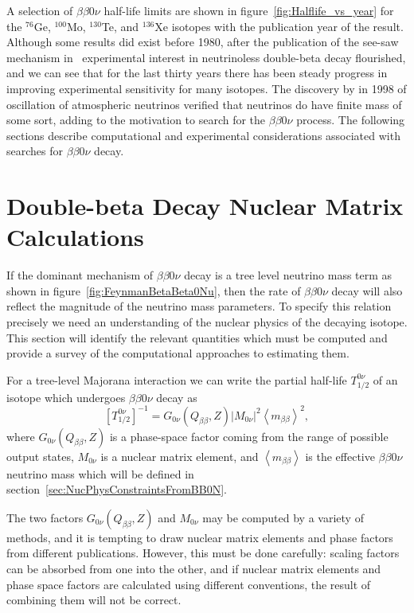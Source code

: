 A selection of $\beta\beta 0\nu$ half-life limits are shown in figure~\ref{fig:Halflife_vs_year} for the $^{76}$Ge, $^{100}$Mo, $^{130}$Te, and $^{136}$Xe isotopes with the publication year of the result.  Although some results did exist before 1980, after the publication of the see-saw mechanism in~\cite{PhysRevLett.44.912,GellMann:1980vs} experimental interest in neutrinoless double-beta decay flourished, and we can see that for the last thirty years there has been steady progress in improving experimental sensitivity for many isotopes.  The discovery by \cite{SuperK} in 1998 of oscillation of atmospheric neutrinos verified that neutrinos do have finite mass of some sort, adding to the motivation to search for the $\beta\beta 0\nu$ process.  The following sections describe computational and experimental considerations associated with searches for $\beta\beta 0\nu$ decay.

\section{Double-beta Decay Nuclear Matrix Calculations}\label{sec:NuclearMatrixCalculations}

If the dominant mechanism of $\beta\beta 0\nu$ decay is a tree level neutrino mass term as shown in figure~\ref{fig:FeynmanBetaBeta0Nu}, then the rate of $\beta\beta 0\nu$ decay will also reflect the magnitude of the neutrino mass parameters.  To specify this relation precisely we need an understanding of the nuclear physics of the decaying isotope.  This section will identify the relevant quantities which must be computed and provide a survey of the computational approaches to estimating them.

For a tree-level Majorana interaction we can write the partial half-life $T^{0\nu}_{1/2}$ of an isotope which undergoes $\beta\beta 0\nu$ decay as
\begin{equation}\label{eqn:HalfLifeMatrixElementEqn}
\left[T^{0\nu}_{1/2}\right]^{-1} = G_{0\nu}(Q_{\beta\beta}, Z) \left| M_{0\nu}\right|^2 \left< m_{\beta\beta} \right>^2,
\end{equation}
where $G_{0\nu}(Q_{\beta\beta}, Z)$ is a phase-space factor coming from the range of possible output states, $M_{0\nu}$ is a nuclear matrix element, and $\left< m_{\beta\beta} \right>$ is the effective $\beta\beta 0\nu$ neutrino mass which will be defined in section~\ref{sec:NucPhysConstraintsFromBB0N}.

The two factors $G_{0\nu}(Q_{\beta\beta}, Z)$ and $M_{0\nu}$ may be computed by a variety of methods, and it is tempting to draw nuclear matrix elements and phase factors from different publications.  However, this must be done carefully: scaling factors can be absorbed from one into the other, and if nuclear matrix elements and phase space factors are calculated using different conventions, the result of combining them will not be correct.

